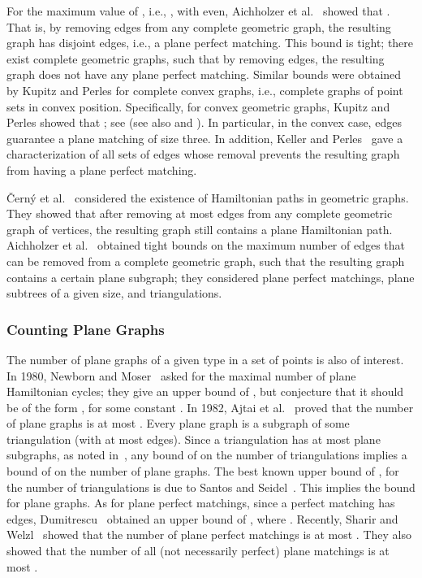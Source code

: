 \documentclass[11pt,a4paper]{article}
\begin{document}
For the maximum value of , i.e., , with  even, Aichholzer et al.~\cite{Aichholzer2010} showed that . That is, by removing  edges from any complete geometric graph, the resulting graph has  disjoint edges, i.e., a plane perfect matching. This bound is tight; there exist complete geometric graphs, such that by removing  edges, the resulting graph does not have any plane perfect matching. Similar bounds were obtained by Kupitz and Perles for complete convex graphs, i.e., complete graphs of point sets in convex position. 
Specifically, for convex geometric graphs, Kupitz and Perles showed that ; see \cite{Goddard1996} (see also \cite{Akiyama1989} and \cite{Alon1989}). In particular, in the convex case,  edges guarantee a plane matching of size three. In addition, Keller and Perles~\cite{Keller2012} gave a characterization of all sets of  edges whose removal prevents the resulting graph from having a plane perfect matching.

\v{C}ern{\'{y}} et al.~\cite{Cerny2007} considered the existence of Hamiltonian paths in geometric graphs. They showed that after removing at most  edges from any complete geometric graph of  vertices, the resulting graph still contains a plane Hamiltonian path. Aichholzer et al.~\cite{Aichholzer2010} obtained tight bounds on the maximum number of edges that can be removed from a complete geometric graph, such that the resulting graph contains a certain plane subgraph; they considered plane perfect matchings, plane subtrees of a given size, and triangulations. 
\subsubsection{Counting Plane Graphs}
The number of plane graphs of a given type in a set of  points is also of interest. In 1980, Newborn and Moser~\cite{Newborn1980} asked for the maximal number of plane Hamiltonian cycles; they give an upper bound of , but conjecture that it should be of the form , for some constant . In 1982, Ajtai et al.~\cite{Ajtai1982} proved that the number of plane graphs is at most . Every plane graph is a subgraph of some triangulation (with at most  edges). Since a triangulation has at most  plane subgraphs, as noted in~\cite{Garcia2000}, any bound of  on the number of triangulations implies a bound of  on the number of plane graphs. The best known upper bound of , for the number of triangulations is due to Santos and Seidel~\cite{Santos2003}. This implies the bound  for plane graphs. As for plane perfect matchings, since a perfect matching has  edges, Dumitrescu~\cite{Dumitrescu1999} obtained an upper bound of , where . Recently, Sharir and Welzl~\cite{Sharir2006} showed that the number of plane perfect matchings is at most . They also showed that the number of all (not necessarily perfect) plane matchings is at most . 
\end{document}

